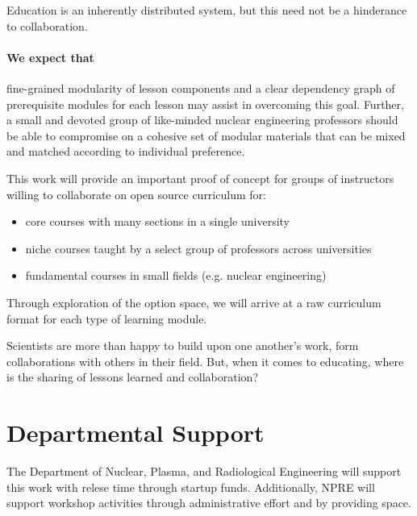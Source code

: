 \documentclass[11pt]{article}
\begin{document}
          Education is an inherently distributed system, but this need not be a 
          hinderance to collaboration.

          \paragraph{We expect that} fine-grained modularity of lesson components and a clear dependency graph of prerequisite modules for each lesson may assist in overcoming this goal. Further, a small 
          and devoted group of like-minded nuclear engineering professors 
          should be able to compromise on a cohesive set of modular materials 
          that can be mixed and matched according to individual preference. 
          
          This work will provide an important proof of concept for groups of 
          instructors willing to collaborate on open source curriculum for:
          \begin{itemize}
                  \item core courses with many sections in a single university
                  \item niche courses taught by a select group of professors across 
          universities
                  \item fundamental courses in small fields (e.g. nuclear engineering)
          \end{itemize}

          Through exploration of the option space, we will arrive at a raw 
          curriculum format for each type of learning module.  

          Scientists are more than happy to build upon one another's work, form 
          collaborations with others in their field. But, 
          when it comes to educating, where is the sharing of lessons learned 
          and collaboration? 

          
          

          \section{Departmental Support}
          The Department of Nuclear, Plasma, and Radiological Engineering will 
          support this work with relese time through startup funds. 
          Additionally, NPRE will support workshop activities through 
          administrative effort and by providing space.
          
\end{document}
